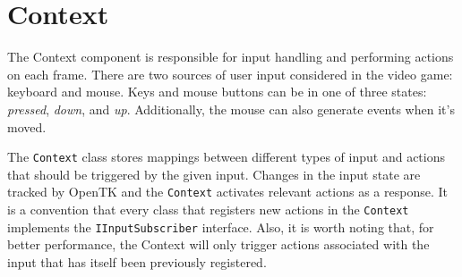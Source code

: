 \section{Context}

The Context component is responsible for input handling and performing actions on each frame.
There are two sources of user input considered in the video game: keyboard and mouse.
Keys and mouse buttons can be in one of three states: \textit{pressed}, \textit{down}, and \textit{up}.
Additionally, the mouse can also generate events when it's moved.

The \texttt{Context} class stores mappings between different types of input and actions that should be triggered by the given input.
Changes in the input state are tracked by OpenTK and the \texttt{Context} activates relevant actions as a response.
It is a convention that every class that registers new actions in the \texttt{Context} implements the \texttt{IInputSubscriber} interface.
Also, it is worth noting that, for better performance, the Context will only trigger actions associated with the input that has itself been previously registered.